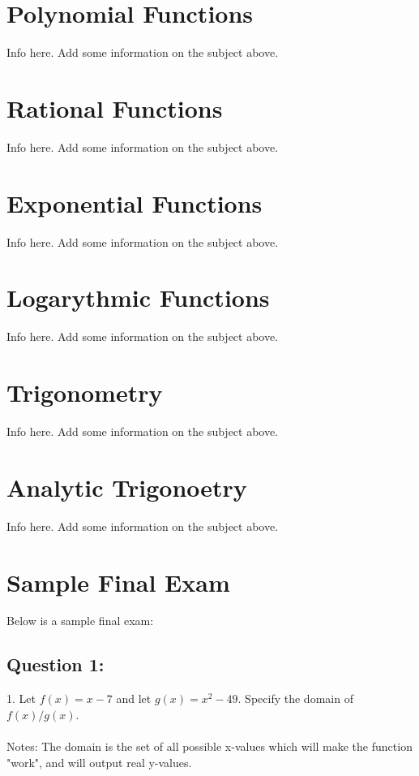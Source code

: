\documentclass[12pt, letterpaper]{article}
\begin{document}
\section{Polynomial Functions}

Info here. Add some information on the subject above. 

\section{Rational Functions}

Info here. Add some information on the subject above. 

\section{Exponential Functions}

Info here. Add some information on the subject above. 

\section{Logarythmic Functions}

Info here. Add some information on the subject above. 

\section{Trigonometry}

Info here. Add some information on the subject above. 

\section{Analytic Trigonoetry}

Info here. Add some information on the subject above. 


\section{Sample Final Exam}

Below is a sample final exam:


\subsection{Question 1:}

1. Let $f(x)=x-7$ and let $g(x)=x^2-49$. Specify the domain of $f(x)/g(x)$.
\\\\
Notes: The domain is the set of all possible x-values which will make the function "work", and will output real y-values.
\end{document}
